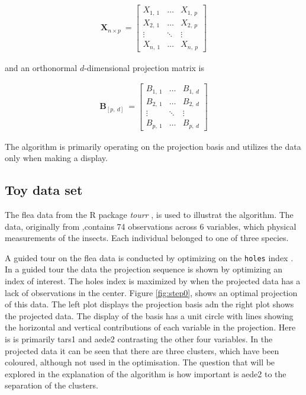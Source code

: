 \documentclass{monashthesis}
\begin{document}
\begin{align*}
  \textbf{X}_{n \times p} ~=
  \begin{bmatrix}
    X_{1,~1} & \dots  & X_{1,~p} \\
    X_{2,~1} & \dots  & X_{2,~p} \\
    \vdots   & \ddots & \vdots   \\
    X_{n,~1} & \dots  & X_{n,~p}
  \end{bmatrix}
\end{align*}

and an orthonormal \(d\)-dimensional projection matrix is

\begin{align*}
  \textbf{B}_{[p,~d]} ~=
  \begin{bmatrix}
    B_{1,~1} & \dots  & B_{1,~d} \\
    B_{2,~1} & \dots  & B_{2,~d} \\
    \vdots   & \ddots & \vdots   \\
    B_{p,~1} & \dots  & B_{p,~d}
  \end{bmatrix}
\end{align*}

The algorithm is primarily operating on the projection basis and utilizes the data only when making a display.

\hypertarget{toy-data-set}{%
\subsection{Toy data set}\label{toy-data-set}}

The flea data from the R package \emph{tourr} \autocite{wickham_tourr_2011}, is used to illustrat the algorithm. The data, originally from \textcite{lubischew_use_1962},contains 74 observations across 6 variables, which physical measurements of the insects. Each individual belonged to one of three species.

A guided tour on the flea data is conducted by optimizing on the \texttt{holes} index \autocite{cook_interactive_2007}. In a guided tour the data the projection sequence is shown by optimizing an index of interest. The holes index is maximized by when the projected data has a lack of observations in the center. Figure \ref{fig:step0}, shows an optimal projection of this data. The left plot displays the projection basis adn the right plot shows the projected data. The display of the basis has a unit circle with lines showing the horizontal and vertical contributions of each variable in the projection. Here is is primarily tars1 and aede2 contrasting the other four variables. In the projected data it can be seen that there are three clusters, which have been coloured, although not used in the optimisation. The question that will be explored in the explanation of the algorithm is how important is aede2 to the separation of the clusters.
\end{document}
